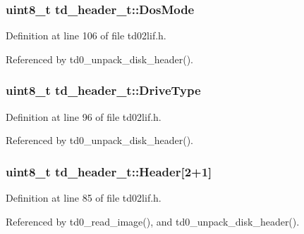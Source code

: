 \subsubsection[{\texorpdfstring{Dos\+Mode}{DosMode}}]{\setlength{\rightskip}{0pt plus 5cm}uint8\+\_\+t td\+\_\+header\+\_\+t\+::\+Dos\+Mode}\hypertarget{structtd__header__t_acb0710bd6f98290ea2490ce678b63894}{}\label{structtd__header__t_acb0710bd6f98290ea2490ce678b63894}


Definition at line 106 of file td02lif.\+h.



Referenced by td0\+\_\+unpack\+\_\+disk\+\_\+header().

\subsubsection[{\texorpdfstring{Drive\+Type}{DriveType}}]{\setlength{\rightskip}{0pt plus 5cm}uint8\+\_\+t td\+\_\+header\+\_\+t\+::\+Drive\+Type}\hypertarget{structtd__header__t_a865bd11809e67fd4ca8f1af0c46d9600}{}\label{structtd__header__t_a865bd11809e67fd4ca8f1af0c46d9600}


Definition at line 96 of file td02lif.\+h.



Referenced by td0\+\_\+unpack\+\_\+disk\+\_\+header().

\subsubsection[{\texorpdfstring{Header}{Header}}]{\setlength{\rightskip}{0pt plus 5cm}uint8\+\_\+t td\+\_\+header\+\_\+t\+::\+Header\mbox{[}2+1\mbox{]}}\hypertarget{structtd__header__t_a41510629d6bb7852f4e1e43443c38edd}{}\label{structtd__header__t_a41510629d6bb7852f4e1e43443c38edd}


Definition at line 85 of file td02lif.\+h.



Referenced by td0\+\_\+read\+\_\+image(), and td0\+\_\+unpack\+\_\+disk\+\_\+header().

